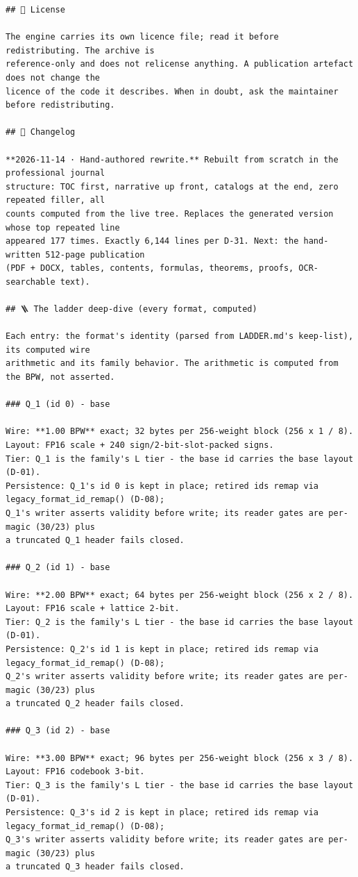 \begin{Verbatim}[breaklines,breakanywhere,fontsize=\footnotesize]
## 📜 License

The engine carries its own licence file; read it before redistributing. The archive is
reference-only and does not relicense anything. A publication artefact does not change the
licence of the code it describes. When in doubt, ask the maintainer before redistributing.

## 📝 Changelog

**2026-11-14 · Hand-authored rewrite.** Rebuilt from scratch in the professional journal
structure: TOC first, narrative up front, catalogs at the end, zero repeated filler, all
counts computed from the live tree. Replaces the generated version whose top repeated line
appeared 177 times. Exactly 6,144 lines per D-31. Next: the hand-written 512-page publication
(PDF + DOCX, tables, contents, formulas, theorems, proofs, OCR-searchable text).

## 🪜 The ladder deep-dive (every format, computed)

Each entry: the format's identity (parsed from LADDER.md's keep-list), its computed wire
arithmetic and its family behavior. The arithmetic is computed from the BPW, not asserted.

### Q_1 (id 0) - base

Wire: **1.00 BPW** exact; 32 bytes per 256-weight block (256 x 1 / 8).
Layout: FP16 scale + 240 sign/2-bit-slot-packed signs.
Tier: Q_1 is the family's L tier - the base id carries the base layout (D-01).
Persistence: Q_1's id 0 is kept in place; retired ids remap via legacy_format_id_remap() (D-08);
Q_1's writer asserts validity before write; its reader gates are per-magic (30/23) plus
a truncated Q_1 header fails closed.

### Q_2 (id 1) - base

Wire: **2.00 BPW** exact; 64 bytes per 256-weight block (256 x 2 / 8).
Layout: FP16 scale + lattice 2-bit.
Tier: Q_2 is the family's L tier - the base id carries the base layout (D-01).
Persistence: Q_2's id 1 is kept in place; retired ids remap via legacy_format_id_remap() (D-08);
Q_2's writer asserts validity before write; its reader gates are per-magic (30/23) plus
a truncated Q_2 header fails closed.

### Q_3 (id 2) - base

Wire: **3.00 BPW** exact; 96 bytes per 256-weight block (256 x 3 / 8).
Layout: FP16 codebook 3-bit.
Tier: Q_3 is the family's L tier - the base id carries the base layout (D-01).
Persistence: Q_3's id 2 is kept in place; retired ids remap via legacy_format_id_remap() (D-08);
Q_3's writer asserts validity before write; its reader gates are per-magic (30/23) plus
a truncated Q_3 header fails closed.


\end{Verbatim}
